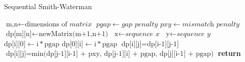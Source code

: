 \begin{algorithm}
\caption{Sequential Smith-Waterman}\label{alg:naive}
\begin{algorithmic}[1]
\State $\text{m,n} \gets \text{dimensions of }\textit{matrix}$
\State $pgap \gets \textit{gap penalty}$
\State $pxy \gets \textit{mismatch penalty}$
\State $\text{dp[m][n]} \gets \text{newMatrix(m+1,n+1)}$
\State $\text{x} \gets \textit{sequence x}$
\State $\text{y} \gets \textit{sequence y}$
    \State $\text{dp[i][0]} \gets \text{i} * \text{pgap}$
\EndFor
{}
    \State $\text{dp[0][i]} \gets \text{i} * \text{pgap}$
\EndFor
{}
    		\State $\text{dp[i][j]} = \text{dp[i-1][j-1]}$
    	\Else
    		\State $\text{dp[i][j]} = \text{min(dp[j-1][i-1] + pxy, dp[j-1][i] + pgap, dp[j][i-1] + pgap)}$
    	\EndIf
    \EndFor
\EndFor
\textbf{return } 
\EndProcedure
\end{algorithmic}
\end{algorithm}